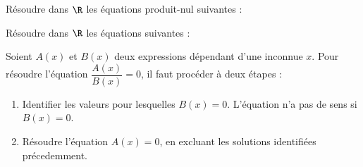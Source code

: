 \documentclass{exam}
\begin{document}
\begin{questions}
\question Résoudre dans $\R$ les équations produit-nul suivantes :
\question 
Résoudre dans $\R$ les équations suivantes :
\makeemptybox{10cm}
\end{questions}
\newpage
\begin{tcolorbox}
\begin{proposition}
Soient $A(x)$ et $B(x)$ deux expressions dépendant d'une inconnue $x$. Pour résoudre l'équation $\dfrac{A(x)}{B(x)}=0$, il faut procéder à deux étapes :
\begin{enumerate}
\item Identifier les valeurs pour lesquelles $B(x)= 0$. L'équation n'a pas de sens si $B(x) = 0$.
\item Résoudre l'équation $A(x)=0$, en excluant les solutions identifiées précedemment.
\end{enumerate}
\end{proposition}    
\end{tcolorbox}
\end{document}
